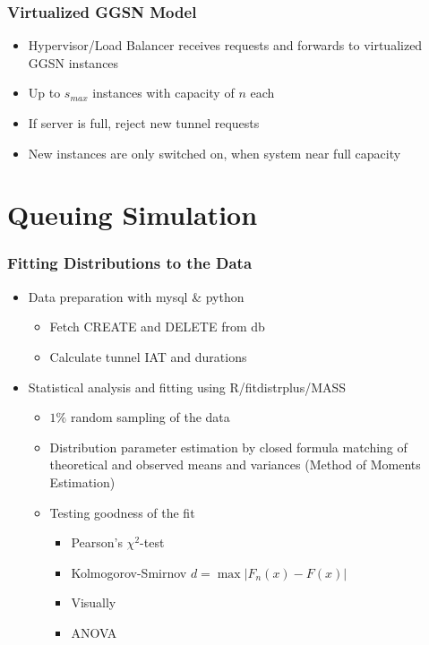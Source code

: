 \documentclass{beamer}
\begin{document}
\begin{frame}
	\frametitle{Virtualized GGSN Model}
		\begin{center}
		\resizebox{!}{4cm}{%
			
		}
		\end{center}

		\begin{itemize}
			\item Hypervisor/Load Balancer receives requests and forwards to virtualized GGSN instances
			\item Up to $s_{max}$ instances with capacity of $n$ each
			\item If server is full, reject new tunnel requests
			\item New instances are only switched on, when system near full capacity
		\end{itemize}
\end{frame}


\section{Queuing Simulation}


\begin{frame}
	\frametitle{Fitting Distributions to the Data}
	\begin{itemize}
		\item Data preparation with mysql \& python
		\begin{itemize}
			\item Fetch CREATE and DELETE from db
			\item Calculate tunnel IAT and durations
		\end{itemize}
		\item Statistical analysis and fitting using R/fitdistrplus/MASS
		\begin{itemize}
			\item $1\%$ random sampling of the data
			\item Distribution parameter estimation by closed formula matching of theoretical and observed means and variances (Method of Moments Estimation)
			\item Testing goodness of the fit
				\begin{itemize}
					\item Pearson's $\chi^2$-test
					\item Kolmogorov-Smirnov $d = \max|F_n(x)-F(x)|$
					\item Visually
					\item ANOVA
				\end{itemize}
		\end{itemize}
	\end{itemize}
\end{frame}
\end{document}
